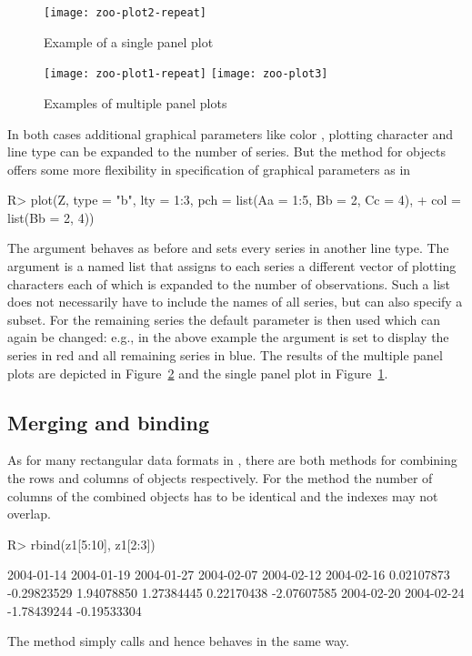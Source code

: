 \documentclass[article,nojss]{jss}
\begin{document}
\begin{figure}[b!]
\begin{center}
\texttt{[image: zoo-plot2-repeat]}
\caption{\label{fig:plot2} Example of a single panel plot}
\end{center}
\end{figure}

\begin{figure}[p]
\begin{center}
\texttt{[image: zoo-plot1-repeat]}
\texttt{[image: zoo-plot3]}
\caption{\label{fig:plot13} Examples of multiple panel plots}
\end{center}
\end{figure}


In both cases additional graphical parameters like color ,
plotting character  and line type  can be
expanded to the number of series. But the  method for
 objects offers some more flexibility in specification
of graphical parameters as in
\begin{Schunk}
\begin{Sinput}
R> plot(Z, type = "b", lty = 1:3, pch = list(Aa = 1:5, Bb = 2, Cc = 4), 
+     col = list(Bb = 2, 4))
\end{Sinput}
\end{Schunk}
The argument  behaves as before and sets every series in another
line type. The  argument is a named list that assigns to each series
a different vector of plotting characters each of which is expanded to the 
number of observations. Such a list does not necessarily have to include the names of all
series, but can also specify a subset. For the remaining series the default parameter
is then used which can again be changed: e.g., in the above example the  argument
is set to display the series  in red and all remaining series in blue.
The results of the multiple panel plots are depicted in Figure~\ref{fig:plot13} and the
single panel plot in Figure~\ref{fig:plot2}.


\subsection{Merging and binding}
\label{sec:merge}

As for many rectangular data formats in , there are
both methods for combining the rows and columns of 
objects respectively. For the  method the number of
columns of the combined objects has to be identical and the
indexes may not overlap.
\begin{Schunk}
\begin{Sinput}
R> rbind(z1[5:10], z1[2:3])
\end{Sinput}
\begin{Soutput}
 2004-01-14  2004-01-19  2004-01-27  2004-02-07  2004-02-12  2004-02-16 
 0.02107873 -0.29823529  1.94078850  1.27384445  0.22170438 -2.07607585 
 2004-02-20  2004-02-24 
-1.78439244 -0.19533304 
\end{Soutput}
\end{Schunk}
The  method simply calls  and hence behaves in the same way.
\end{document}

